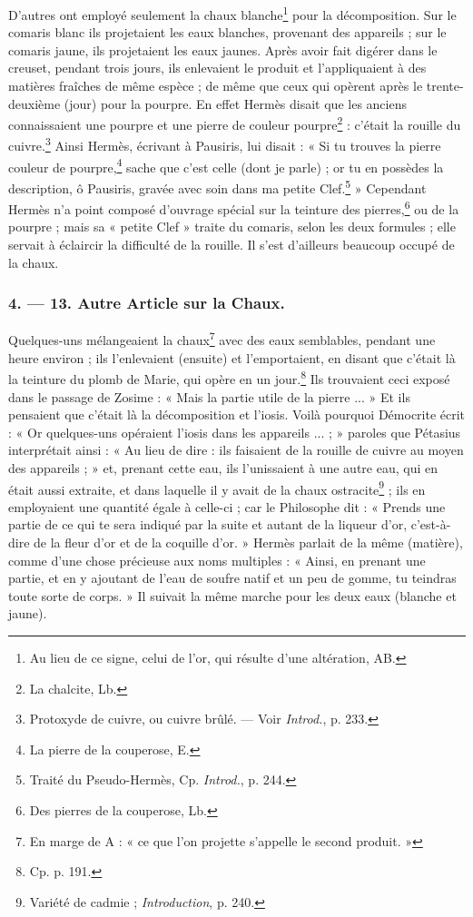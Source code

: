 \documentclass[a4paper, 11pt, oneside, polutonikogreek, french]{article}
\begin{document}
D'autres ont employé seulement la chaux blanche\footnote{Au lieu de ce signe, celui de l'or, qui résulte d'une altération, AB.} pour la décomposition. Sur le comaris blanc ils projetaient les eaux blanches, provenant des appareils ; sur le comaris jaune, ils projetaient les eaux jaunes. Après avoir fait digérer dans le creuset, pendant trois jours, ils enlevaient le produit et l'appliquaient à des matières fraîches de même espèce ; de même que ceux qui opèrent après le trente-deuxième (jour) pour la pourpre. En effet Hermès disait que les anciens connaissaient une pourpre et une pierre de couleur pourpre\footnote{La chalcite, Lb.} : c'était la rouille du cuivre.\footnote{Protoxyde de cuivre, ou cuivre brûlé. --- Voir \emph{Introd.}, p. 233.} Ainsi Hermès, écrivant à Pausiris, lui disait : « Si tu trouves la pierre couleur de pourpre,\footnote{La pierre de la couperose, E.} sache que c'est celle (dont je parle) ; or tu en possèdes la description, ô Pausiris, gravée avec soin dans ma petite Clef.\footnote{Traité du Pseudo-Hermès, Cp. \emph{Introd.}, p. 244.} » Cependant Hermès n'a point composé d'ouvrage spécial sur la teinture des pierres,\footnote{Des pierres de la couperose, Lb.} ou de la pourpre ; mais sa « petite Clef » traite du comaris, selon les deux formules ; elle servait à éclaircir la difficulté de la rouille. Il s'est d'ailleurs beaucoup occupé de la chaux.

\bigskip
\centerline{\EightStarTaper}
\centerline{\EightStarTaper\EightStarTaper}
\bigskip

\subsubsection{4. --- 13. Autre Article sur la Chaux.}

Quelques-uns mélangeaient la chaux\footnote{En marge de A : « ce que l'on projette s'appelle le second produit. »} avec des eaux semblables, pendant une heure environ ; ils l'enlevaient (ensuite) et l'emportaient, en disant que c'était là la teinture du plomb de Marie, qui opère en un jour.\footnote{Cp. p. 191.} Ils trouvaient ceci exposé dans le passage de Zosime : « Mais la partie utile de la pierre ... » Et ils pensaient que c'était là la décomposition et l'iosis. Voilà pourquoi Démocrite écrit : « Or quelques-uns opéraient l'iosis dans les appareils ... ; » paroles que Pétasius interprétait ainsi : « Au lieu de dire : ils faisaient de la rouille de cuivre au moyen des appareils ; » et, prenant cette eau, ils l'unissaient à une autre eau, qui en était aussi extraite, et dans laquelle il y avait de la chaux ostracite\footnote{Variété de cadmie ; \emph{Introduction}, p. 240.} ; ils en employaient une quantité égale à celle-ci ; car le Philosophe dit : « Prends une partie de ce qui te sera indiqué par la suite et autant de la liqueur d'or, c'est-à-dire de la fleur d'or et de la coquille d'or. » Hermès parlait de la même (matière), comme d'une chose précieuse aux noms multiples : « Ainsi, en prenant une partie, et en y ajoutant de l'eau de soufre natif et un peu de gomme, tu teindras toute sorte de corps. » Il suivait la même marche pour les deux eaux (blanche et jaune).
\end{document}
